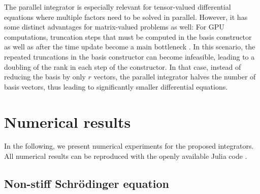 \documentclass[preprint,runningheads]{svjour3}
\begin{document}
The parallel integrator is especially relevant for tensor-valued differential equations where multiple factors need to be solved in parallel. However, it has some distinct advantages for matrix-valued problems as well: For GPU computations, truncation steps that must be computed in the basis constructor as well as after the time update become a main bottleneck \cite{boukaram2017batched}. In this scenario, the repeated truncations in the basis constructor can become infeasible, leading to a doubling of the rank in each step of the constructor. In that case, instead of reducing the basis by only $r$ vectors, the parallel integrator halves the number of basis vectors, thus leading to significantly smaller differential equations.

\section{Numerical results}\label{sec:numerics}

 {In the following, we present numerical experiments for the proposed integrators. All numerical results can be reproduced with the openly available Julia code \cite{code}.}

\subsection{Non-stiff Schr\"odinger equation}
\label{sec:num_nonstiff_schroedinger}
\end{document}
